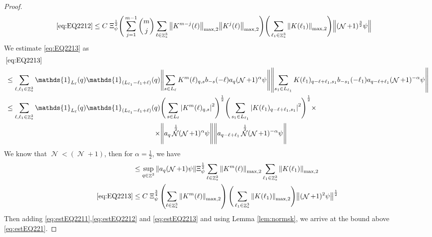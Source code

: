 \documentclass[sn-mathphys, Numbered ,a4paper]{sn-jnl}%
\DeclareMathOperator{\Z}{\mathbb{Z}}
\DeclareMathOperator{\NN}{\mathcal{N}}
\newcommand{\half}{\frac{1}{2}}
\theoremstyle{plain}
\theoremstyle{definition}
\theoremstyle{remark}
\theoremstyle{plain}
\theoremstyle{definition}
\theoremstyle{remark}
\begin{document}
{\begin{proof}
\begin{alignat}{2}
 	\eqref{eq:EQ2212}&\leq C\; \Xi_{\psi}^\half \Bigg(\sum\limits_{j=1}^{m-1} {{m}\choose j} \sum\limits_{\ell \in \Z^3_*} \norm{K^{m-j}(\ell)}_{ \mathrm{max,2} } \norm{K^{j}(\ell)}_{\mathrm{max,2}}\Bigg) \Bigg(\sum\limits_{ \ell_1\in \Z^3_*}\norm{  K(\ell_1)}_{\mathrm{max,2}}\Bigg)  \norm{(\NN+1)^\frac{3}{2} \psi} \label{eq:estEQ2212}
 \end{alignat}
 We estimate \eqref{eq:EQ2213} as
\begin{alignat}{2}
	&\eqref{eq:EQ2213}\nonumber\\
	&\leq\sum\limits_{\ell, \ell_1\in \Z^3_*}  \mathds{1}_{L_{\ell}}(q) \mathds{1}_{(L_{\ell_1}-\ell_1+\ell)}(q) \norm{ \sum\limits_{s\in L_{\ell}} K^m(\ell)_{q,s} b_{-s}(-\ell) a_{q}(\NN+1)^{\alpha}\psi}\norm{ \sum\limits_{s_1 \in L_{\ell_1}} K(\ell_1)_{q-\ell+\ell_1,s_1} b_{-s_1}(-\ell_1)a_{q-\ell+\ell_1} (\NN+1)^{-\alpha} \psi }\nonumber\\
	&\leq\sum\limits_{\ell, \ell_1\in \Z^3_*} \mathds{1}_{L_{\ell}}(q) \begin{aligned}[t] \mathds{1}_{(L_{\ell_1}-\ell_1+\ell)}(q) &\Bigg(\sum\limits_{s \in L_{\ell}} \abs{K^m(\ell)_{q,s}}^2\Bigg)^\half \Bigg(\sum\limits_{s_1 \in L_{\ell_1}} \abs{K(\ell_1)_{q-\ell+\ell_1,s_1}}^2\Bigg)^\half \times\nonumber\\ \times&\norm{ a_{q} \NN^\half (\NN+1)^{\alpha}\psi} \norm{ a_{q-\ell+\ell_1} \NN^\half (\NN+1)^{-\alpha} \psi }\end{aligned}\\
\end{alignat}
We know that $\NN<(\NN+1)$, then for $\alpha = \half$, we have
\begin{align}
	&\leq \sup_{q \in \Z^3}\norm{ a_{q} (\NN+1)\psi} \Xi_{\psi}^\half\sum\limits_{\ell \in \Z^3_*} \norm{  K^{m}(\ell)}_{\mathrm{max,2}}  \sum\limits_{\ell_1 \in \Z^3_*} \norm{K(\ell_1)}_{\mathrm{max,2}} \nonumber\\
	\eqref{eq:EQ2213}&\leq C\;\Xi_{\psi}^{\frac{3}{4}} \left(\sum\limits_{\ell \in \Z^3_*} \norm{K^m(\ell)}_{\mathrm{max,2}}\right) \Bigg(\sum\limits_{\ell_1 \in \Z^3_*} \norm{K(\ell_1)}_{\mathrm{max,2}} \Bigg)  \norm{ (\NN+1)^2\psi}^\half \label{eq:estEQ2213}
\end{align}
 Then adding \eqref{eq:estEQ2211},\eqref{eq:estEQ2212} and \eqref{eq:estEQ2213} and using Lemma \ref{lem:normsk}, we arrive at the bound above \eqref{eq:estEQ221}. 
\end{proof}}
\end{document}
